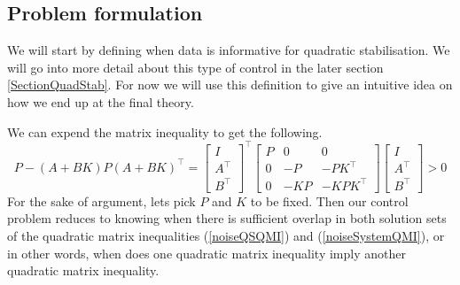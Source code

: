 


\subsection{Problem formulation}
We will start by defining when data is informative for quadratic stabilisation. We will go into more detail about this type of control in the later section \ref{SectionQuadStab}. For now we will use this definition to give an intuitive idea on how we end up at the final theory.


We can expend the matrix inequality to get the following.
\begin{equation} \label{noiseQSQMI}
	P - (A + BK) P (A + BK)^\top = 
	\begin{bmatrix} I\\A^\top\\B^\top \end{bmatrix}^\top 
	\begin{bmatrix} P&0&0\\0&-P&-PK^\top\\0&-KP&-KPK^\top \end{bmatrix} 
	\begin{bmatrix} I\\A^\top\\B^\top \end{bmatrix} > 0
\end{equation}
For the sake of argument, lets pick $P$ and $K$ to be fixed. Then our control problem reduces to knowing when there is sufficient overlap in both solution sets of the quadratic matrix inequalities (\ref{noiseQSQMI}) and (\ref{noiseSystemQMI}), or in other words, when does one quadratic matrix inequality imply another quadratic matrix inequality.




